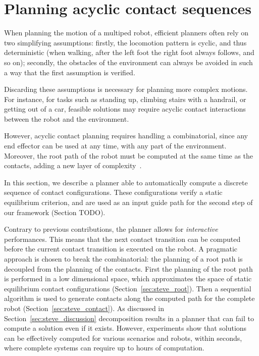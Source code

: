 \section{Planning acyclic contact sequences}
When planning the motion of a multiped robot, efficient
planners often rely on two simplifying assumptions:
firstly, the locomotion pattern is cyclic, and thus deterministic (when walking, after the left
foot the right foot always follows, and so on); secondly, the obstacles of the environment
can always be avoided in such a way that the first assumption is verified.

Discarding these assumptions is necessary for planning more complex motions.
For instance, for tasks such as standing up, climbing stairs
with a handrail, or getting out of a car, feasible solutions may require acyclic contact interactions between the robot and the environment.

However, acyclic contact planning requires 
handling a combinatorial, since any end effector can be used 
at any time, with any part of the environment. Moreover, the root path of the robot
must be computed at the same time as the contacts, adding a new layer of complexity~\citep{Bretl:2006:MPM:1124573.1124585, DBLP:conf/iser/EscandeKMG08}.

In this section, we describe a planner able to automatically compute 
a discrete sequence of contact configurations. These configurations verify a static equilibrium criterion,
and are used as an input guide path for the second step of our framework (Section TODO).

Contrary to previous contributions, the planner allows for \textit{interactive} performances.
This means that the next contact transition can be computed before the current contact transition
is executed on the robot. A pragmatic approach is chosen to break the combinatorial:
the planning of a root path is decoupled from the planning of the contacts.
First the planning of the root path is performed in a low dimensional space, which approximates 
the space of static equilibrium contact configurations (Section~\ref{sec:steve_root}).
Then a sequential algorithm is used to generate contacts along the computed path for the complete robot (Section~\ref{sec:steve_contact}).
As discussed in Section~\ref{sec:steve_discussion} decomposition results in a planner that can fail to compute a solution even if it exists.
However, experiments show that solutions can be effectively computed for various scenarios and robots, within seconds, where
complete systems can require up to hours of computation.

